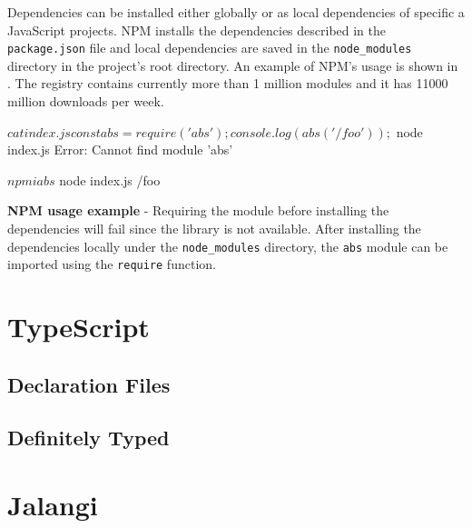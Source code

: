 Dependencies can be installed either globally or as local dependencies of specific a JavaScript projects. NPM installs the dependencies described in the \texttt{package.json} file and local dependencies are saved in the \texttt{node_modules} directory in the project's root directory. An example of NPM's usage is shown in . The registry contains currently more than 1 million modules and it has 11000 million downloads per week.

\begin{code}
	\begin{bashinline}
$ cat index.js 
const abs = require('abs');
console.log(abs('/foo'));

$ node index.js
Error: Cannot find module 'abs'

$ npm i abs
$ node index.js
/foo
	  \end{bashinline}
	\caption[NPM usage example]{\textbf{NPM usage example} - Requiring the module before installing the dependencies will fail since the library is not available. After installing the dependencies locally under the \texttt{node_modules} directory, the \texttt{abs} module can be imported using the \texttt{require} function.}
	\label{code:background-npm-usage-example}
  \end{code}

\section{TypeScript} \label{sec:background-typescript}
\subsection{Declaration Files} \label{sec:declaration-files-background}
\subsection{Definitely Typed}

\section{Jalangi} \label{sec:jalangi}